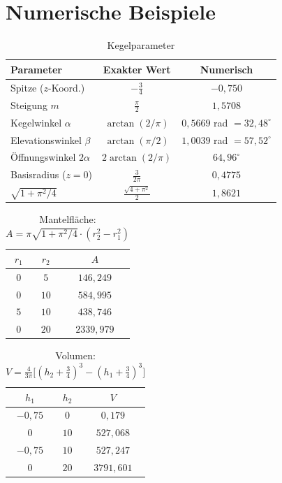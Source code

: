 \documentclass[12pt,a4paper]{article}
\theoremstyle{plain}
\theoremstyle{definition}
\theoremstyle{remark}
\begin{document}
\section{Numerische Beispiele}

\begin{table}[H]
\centering
\caption{Kegelparameter}\label{tab:kegelparameter}
\begin{tabular}{lcc}
\toprule
Parameter & Exakter Wert & Numerisch \\
\midrule
Spitze ($z$-Koord.) & $-\tfrac{3}{4}$ & $-0{,}750$ \\
Steigung $m$ & $\tfrac{\pi}{2}$ & $1{,}5708$ \\
Kegelwinkel $\alpha$ & $\arctan(2/\pi)$ & $0{,}5669$ rad $= 32{,}48^\circ$ \\
Elevationswinkel $\beta$ & $\arctan(\pi/2)$ & $1{,}0039$ rad $= 57{,}52^\circ$ \\
\"{O}ffnungswinkel $2\alpha$ & $2\arctan(2/\pi)$ & $64{,}96^\circ$ \\
Basisradius ($z=0$) & $\tfrac{3}{2\pi}$ & $0{,}4775$ \\
$\sqrt{1+\pi^2/4}$ & $\tfrac{\sqrt{4+\pi^2}}{2}$ & $1{,}8621$ \\
\bottomrule
\end{tabular}
\end{table}

\begin{table}[H]
\centering
\caption{Mantelfl\"{a}che: $A = \pi\sqrt{1+\pi^2/4}\cdot(r_2^2-r_1^2)$}
\label{tab:mantelflaeche}
\begin{tabular}{ccc}
\toprule
$r_1$ & $r_2$ & $A$ \\
\midrule
$0$ & $5$  & $146{,}249$ \\
$0$ & $10$ & $584{,}995$ \\
$5$ & $10$ & $438{,}746$ \\
$0$ & $20$ & $2339{,}979$ \\
\bottomrule
\end{tabular}
\end{table}

\begin{table}[H]
\centering
\caption{Volumen: $V = \tfrac{4}{3\pi}\bigl[(h_2+\tfrac{3}{4})^3-(h_1+\tfrac{3}{4})^3\bigr]$}
\label{tab:volumen}
\begin{tabular}{ccc}
\toprule
$h_1$ & $h_2$ & $V$ \\
\midrule
$-0{,}75$ & $0$  & $0{,}179$ \\
$0$       & $10$ & $527{,}068$ \\
$-0{,}75$ & $10$ & $527{,}247$ \\
$0$       & $20$ & $3791{,}601$ \\
\bottomrule
\end{tabular}
\end{table}
\end{document}
